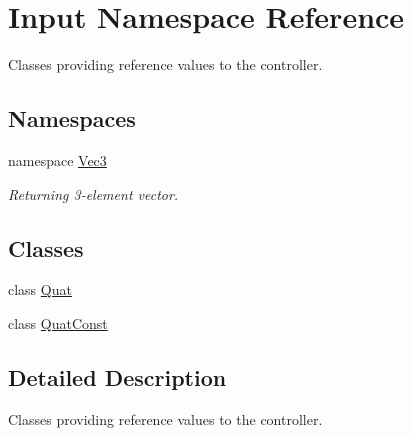 \hypertarget{namespaceInput}{
\section{Input Namespace Reference}
\label{namespaceInput}
}


Classes providing reference values to the controller.  
\subsection*{Namespaces}
\begin{DoxyCompactItemize}
\item 
namespace \hyperlink{namespaceInput_1_1Vec3}{Vec3}


\begin{DoxyCompactList}\small\item\em Returning 3-\/element vector. \item\end{DoxyCompactList}\end{DoxyCompactItemize}
\subsection*{Classes}
\begin{DoxyCompactItemize}
\item 
class \hyperlink{classInput_1_1Quat}{Quat}
\item 
class \hyperlink{classInput_1_1QuatConst}{QuatConst}
\end{DoxyCompactItemize}


\subsection{Detailed Description}
Classes providing reference values to the controller. 